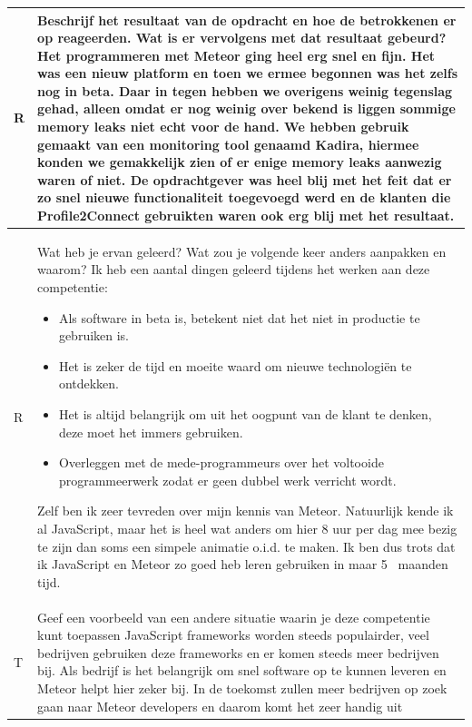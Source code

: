 \begin{tabularx}{\textwidth}{| l | X |}
\\
\hline
R & Beschrijf het resultaat van de opdracht en hoe de betrokkenen er op reageerden. Wat is er vervolgens met dat resultaat gebeurd?
\newline
\newline
Het programmeren met Meteor ging heel erg snel en fijn. Het was een nieuw platform en toen we ermee begonnen was het zelfs nog in beta. Daar in tegen hebben we overigens weinig tegenslag gehad, alleen omdat er nog weinig over bekend is liggen sommige memory leaks niet echt voor de hand. We hebben gebruik gemaakt van een monitoring tool genaamd Kadira, hiermee konden we gemakkelijk zien of er enige memory leaks aanwezig waren of niet. De opdrachtgever was heel blij met het feit dat er zo snel nieuwe functionaliteit toegevoegd werd en de klanten die Profile2Connect gebruikten waren ook erg blij met het resultaat.
\\
\hline
R & Wat heb je ervan geleerd? Wat zou je volgende keer anders aanpakken en waarom?
\newline
\newline
Ik heb een aantal dingen geleerd tijdens het werken aan deze competentie:
\begin{itemize}
\item Als software in beta is, betekent niet dat het niet in productie te gebruiken is.
\item Het is zeker de tijd en moeite waard om nieuwe technologiën te ontdekken.
\item Het is altijd belangrijk om uit het oogpunt van de klant te denken, deze moet het immers gebruiken.
\item Overleggen met de mede-programmeurs over het voltooide programmeerwerk zodat er geen dubbel werk verricht wordt.
\end{itemize}

Zelf ben ik zeer tevreden over mijn kennis van Meteor. Natuurlijk kende ik al JavaScript, maar het is heel wat anders om hier 8 uur per dag mee bezig te zijn dan soms een simpele animatie o.i.d. te maken. Ik ben dus trots dat ik JavaScript en Meteor zo goed heb leren gebruiken in maar 5~ maanden tijd.
\\
\hline
T & Geef een voorbeeld van een andere situatie waarin je deze competentie kunt toepassen
\newline
\newline
JavaScript frameworks worden steeds populairder, veel bedrijven gebruiken deze frameworks en er komen steeds meer bedrijven bij. Als bedrijf is het belangrijk om snel software op te kunnen leveren en Meteor helpt hier zeker bij. In de toekomst zullen meer bedrijven op zoek gaan naar Meteor developers en daarom komt het zeer handig uit
\\
\hline
\end{tabularx}

